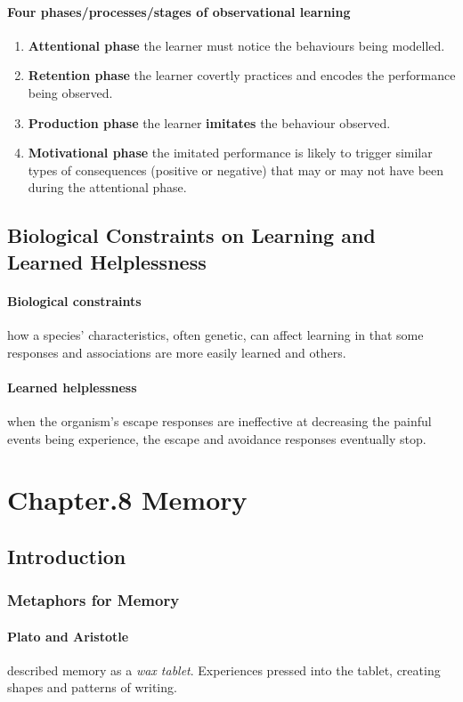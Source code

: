 \documentclass{article}
\begin{document}
	\paragraph{Four phases/processes/stages of observational learning}
	\begin{enumerate}
		\item \textbf{Attentional phase} the learner must notice the behaviours being modelled.
		\item \textbf{Retention phase} the learner covertly practices and encodes the performance being observed.
		\item \textbf{Production phase} the learner \textbf{imitates} the behaviour observed.
		\item \textbf{Motivational phase} the imitated performance is likely to trigger similar types of consequences (positive or negative) that may or may not have been during the attentional phase.
	\end{enumerate}
	\subsection{Biological Constraints on Learning and Learned Helplessness}
	\paragraph{Biological constraints} how a species' characteristics, often genetic, can affect learning in that some responses and associations are more easily learned and others.
	\paragraph{Learned helplessness} when the organism's escape responses are ineffective at decreasing the painful events being experience, the escape and avoidance responses eventually stop.

	\section{Chapter.8 Memory}
	\subsection{Introduction}
	\subsubsection{Metaphors for Memory}
	\paragraph{Plato and Aristotle} described memory as a \emph{wax tablet}. Experiences pressed into the tablet, creating shapes and patterns of writing. 
\end{document}

